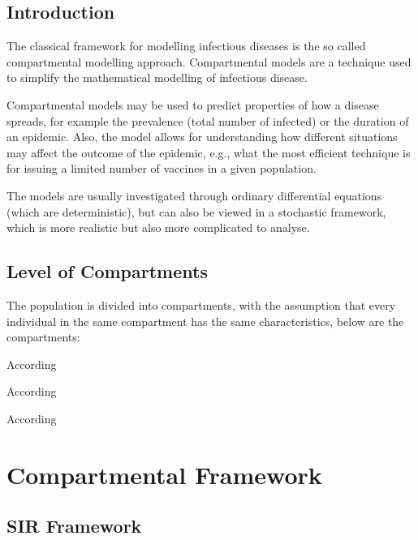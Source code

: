 \documentclass[fontsize=17pt]{article}
\begin{document}
\subsection{Introduction}
The classical framework for modelling infectious diseases is the so called compartmental modelling approach. Compartmental models are a technique used to simplify the mathematical modelling of infectious disease. 

Compartmental models may be used to predict properties of how a disease spreads, for example the prevalence (total number of infected) or the duration of an epidemic. Also, the model allows for understanding how different situations may affect the outcome of the epidemic, e.g., what the most efficient technique is for issuing a limited number of vaccines in a given population. 

The models are usually investigated through ordinary differential equations (which are deterministic), but can also be viewed in a stochastic framework, which is more realistic but also more complicated to analyse.


\subsection{Level of Compartments}
The population is divided into compartments, with the assumption that every individual in the same compartment has the same characteristics, below are the compartments:

\begin{description}[leftmargin=!,labelwidth=\widthof{\bfseries Susceptibles}]
	
	\item[Susceptibles] According 
	\item[Infactives] According 
	\item[Removed] According 
	
\end{description}

\section{Compartmental Framework}
\subsection{SIR Framework}
\end{document}
